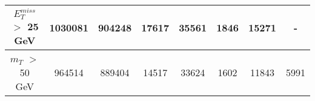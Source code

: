 \documentclass[10pt]{article}
\begin{document}
\begin{center}
\begin{table}[H]
\begin{adjustbox}{width=1\textwidth}
\begin{tabular}{cccccccc}
\multicolumn{1}{|c|}{$E_{T}^{miss}$ $>$ 25 GeV}  & \multicolumn{1}{c|}{1030081} & \multicolumn{1}{c|}{904248} & \multicolumn{1}{c|}{17617} & \multicolumn{1}{c|}{35561} & \multicolumn{1}{c|}{1846} & \multicolumn{1}{c|}{15271} & \multicolumn{1}{c|}{-}  \\ \hline 
\multicolumn{1}{|c|}{$m_{T}$ $>$ 50 GeV}  & \multicolumn{1}{c|}{964514} & \multicolumn{1}{c|}{889404} & \multicolumn{1}{c|}{14517} & \multicolumn{1}{c|}{33624} & \multicolumn{1}{c|}{1602} & \multicolumn{1}{c|}{11843} & \multicolumn{1}{c|}{5991}  \\ \hline 
\end{tabular} 										
\end{adjustbox}										
\end{table} 											
\end{center}											
\end{document}

